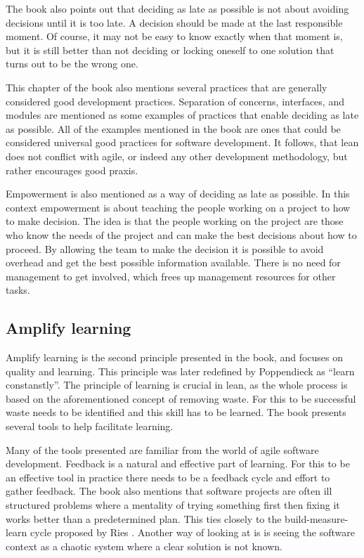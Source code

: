 The book also points out that deciding as late as possible is not about avoiding decisions until it is too late. A decision should be made at the last responsible moment.\cite{poppendieck2003lean} Of course, it may not be easy to know exactly when that moment is, but it is still better than not deciding or locking oneself to one solution that turns out to be the wrong one.

This chapter of the book also mentions several practices that are generally considered good development practices. Separation of concerns, interfaces, and modules are mentioned as some examples of practices that enable deciding as late as possible.\cite{poppendieck2003lean} All of the examples mentioned in the book are ones that could be considered universal good practices for software development. It follows, that lean does not conflict with agile, or indeed any other development methodology, but rather encourages good praxis.

Empowerment is also mentioned as a way of deciding as late as possible. In this context empowerment is about teaching the people working on a project to how to make decision. The idea is that the people working on the project are those who know the needs of the project and can make the best decisions about how to proceed. By allowing the team to make the decision it is possible to avoid overhead and get the best possible information available. There is no need for management to get involved, which frees up management resources for other tasks.\cite{poppendieck2003lean}


\subsection{Amplify learning}

Amplify learning is the second principle presented in the book, and focuses on quality and learning\cite{poppendieck2003lean}. This principle was later redefined by Poppendieck as ``learn constanstly''\cite{Poppendieck2010Lean}. The principle of learning is crucial in lean, as the whole process is based on the aforementioned concept of removing waste. For this to be successful waste needs to be identified and this skill has to be learned. The book presents several tools to help facilitate learning.

Many of the tools presented are familiar from the world of agile software development. Feedback is a natural and effective part of learning. For this to be an effective tool in practice there needs to be a feedback cycle and effort to gather feedback. The book also mentions that software projects are often ill structured problems where a mentality of trying something first then fixing it works better than a predetermined plan.\cite{poppendieck2003lean} This ties closely to the build-measure-learn cycle proposed by Ries \cite{ries2011lean}. Another way of looking at is is seeing the software context as a chaotic system where a clear solution is not known.

